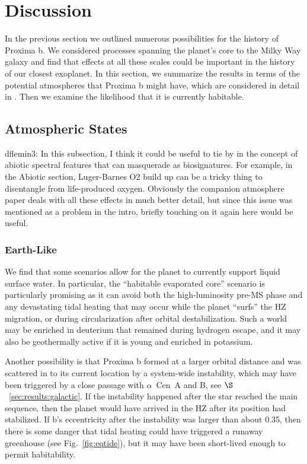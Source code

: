 \documentclass[preprint,12pt]{aastex}
\newcommand{\xxx}[1]{{\color{red} #1}} %
\def\acen{{$\alpha$~Cen}}
\begin{document}
\section{Discussion\label{sec:disc}}

In the previous section we outlined numerous possibilities for the
history of Proxima b. We considered processes spanning the planet's
core to the Milky Way galaxy and find that effects at all these scales
could be important in the history of our closest exoplanet. In this
section, we summarize the results in terms of the potential
atmospheres that Proxima b might have, which are considered in
detail in \citep{Meadows16}. Then we examine the likelihood that it is
currently habitable.

\subsection{Atmospheric States}
\label{sec:results:atmstates}

\xxx{dflemin3:  In this subsection, I think it could be useful to tie by in the concept of abiotic spectral features that can 
masquerade as biosignatures.  For example, in the Abiotic section, Luger-Barnes O2 build up can be a tricky thing to
disentangle from life-produced oxygen.  Obviously the companion atmosphere paper deals with all these effects in much
better detail, but since this issue was mentioned as a problem in the intro, briefly touching on it again here would be useful.}

\subsubsection{Earth-Like}
\label{sec:results:atmstates:earthlike}

We find that some scenarios allow for the planet to currently support liquid
surface water. In particular, the ``habitable evaporated core'' scenario
\citep{Luger15} is particularly promising as it can avoid both the
high-luminosity pre-MS phase and any devastating tidal
heating that may occur while the planet ``surfs'' the HZ migration, or
during circularization after orbital destabilization. Such a world may
be enriched in deuterium that remained during hydrogen escape, and it
may also be geothermally active if it is young and enriched in
potassium.

Another possibility is that Proxima b formed at a larger orbital
distance and was scattered in to its current location by a system-wide
instability, which may have been triggered by a close passage with
\acen~A and B, see $\S$~\ref{sec:results:galactic}. If the instability
happened after the star reached the main sequence, then the planet
would have arrived in the HZ after its position had stabilized. If b's
eccentricity after the instability was larger than about 0.35, then
there is some danger that tidal heating could have triggered a runaway
greenhouse (see Fig.~\ref{fig:eqtide}), but it may have been
short-lived enough to permit habitability.
\end{document}
